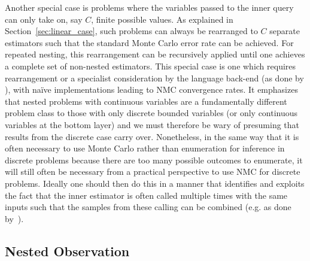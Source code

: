 Another special case is problems where the variables passed to the inner query can only take on, say $C$, finite
possible values. As
explained in Section~\ref{sec:linear_case}, such problems can always be rearranged to
$C$ separate estimators such that the standard Monte Carlo error rate can be achieved.
For repeated nesting, this rearrangement can be recursively applied until one achieves
a complete set of non-nested estimators.  This special case is one which requires rearrangement
or a specialist consideration by the language back-end (as done by \cite{stuhlmuller2012dynamic,stuhlmuller2014reasoning,cornish2017efficient}),
with na\"{i}ve implementations leading to NMC convergence rates.  It emphasizes that
nested problems with continuous variables are a fundamentally different problem
class to those with only discrete bounded variables (or only continuous variables at the bottom layer)
and we must therefore be wary of presuming that results from the discrete case carry over.
Nonetheless, in the same way that it is often necessary to use Monte Carlo rather than enumeration
for inference in discrete problems because there are too many possible outcomes to enumerate, 
it will still often be necessary from a practical perspective
to use NMC for discrete problems. Ideally one should then do this in a manner that identifies and exploits the fact that
the inner estimator is often called multiple times with the same inputs such that the samples
from these calling can be combined (e.g. as done by~\cite{stuhlmuller2012dynamic}).

\subsection{Nested Observation}
\label{sec:design:imp:obs}

